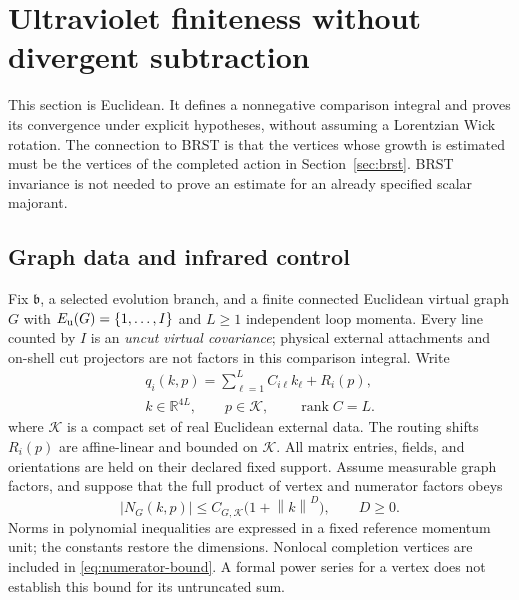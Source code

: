 \documentclass[final,5p,times,twocolumn,numbers,nopreprintline]{elsarticle}
\numberwithin{equation}{section}
\theoremstyle{definition}
\theoremstyle{remark}
\newcommand{\bb}{\mathfrak b}
\newcommand{\rank}{\operatorname{rank}}
\newcommand{\RR}{\mathbb R}
\newcommand{\norm}[1]{\left\lVert #1\right\rVert}
\newcommand{\abs}[1]{\left\lvert #1\right\rvert}
\begin{document}
\section{Ultraviolet finiteness without divergent subtraction}
\label{sec:uv}

This section is Euclidean. It defines a nonnegative comparison
integral and proves its convergence under explicit hypotheses,
without assuming a Lorentzian Wick rotation.
The connection to BRST is that the vertices whose growth is estimated
must be the vertices of the completed action in
Section~\ref{sec:brst}. BRST invariance is not needed to prove an
estimate for an already specified scalar majorant.

\subsection{Graph data and infrared control}

Fix \(\bb\), a selected evolution branch, and a finite connected
Euclidean virtual graph \(G\) with
\(E_{\rm u}(G)=\{1,\ldots,I\}\) and \(L\geq1\)
independent loop momenta. Every line counted by \(I\) is an
\emph{uncut virtual covariance}; physical external attachments and
on-shell cut projectors are not factors in this comparison integral.
Write
\begin{equation}
\begin{gathered}
 q_i(k,p)=\sum_{\ell=1}^L C_{i\ell}k_\ell+R_i(p),\\
 k\in\RR^{4L},\qquad p\in\mathcal K,\qquad\rank C=L.
\end{gathered}
 \label{eq:routing}
\end{equation}
where \(\mathcal K\) is a compact set of real Euclidean external data.
The routing shifts \(R_i(p)\) are affine-linear and bounded on \(\mathcal K\).
All matrix entries, fields, and orientations are held on their
declared fixed support. Assume measurable graph factors, and suppose
that the full product of vertex and numerator factors obeys
\begin{equation}
 \abs{N_G(k,p)}\leq C_{G,\mathcal K}\bigl(1+\norm{k}^D\bigr),
 \qquad D\geq0.
 \label{eq:numerator-bound}
\end{equation}
Norms in polynomial inequalities are expressed in a fixed reference
momentum unit; the constants restore the dimensions. Nonlocal
completion vertices are included in \eqref{eq:numerator-bound}.
A formal power series for a vertex does not establish this bound for
its untruncated sum.
\end{document}

